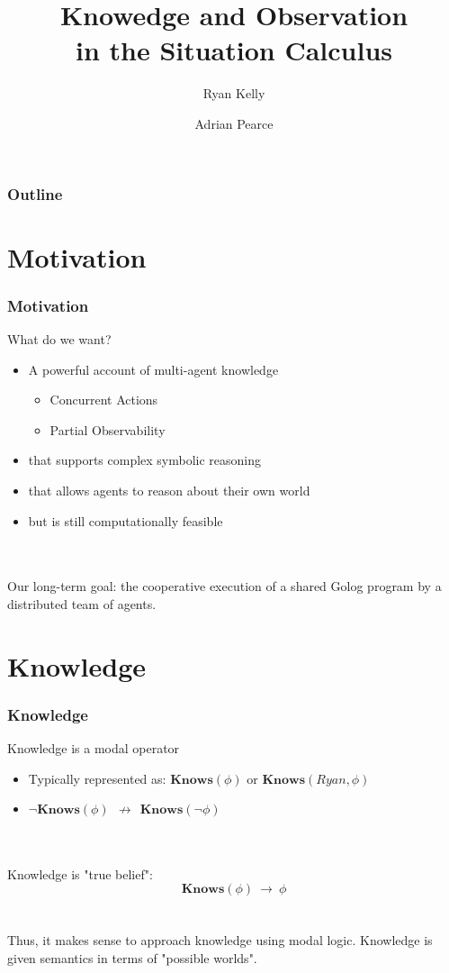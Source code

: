 \documentclass{beamer}
\title{Knowedge and Observation\\ in the Situation Calculus}
\author[Ryan Kelly (rfk@csse.unimelb.edu.au)]{Ryan Kelly \and Adrian Pearce}
\begin{document}
\begin{frame}
  \titlepage
\end{frame}

\begin{frame}
  \frametitle{Outline}
  \tableofcontents
\end{frame}

\section{Motivation}

\begin{frame}
\frametitle{Motivation}
What do we want?
\begin{itemize}
\item A powerful account of multi-agent knowledge
  \begin{itemize}
  \item Concurrent Actions
  \item Partial Observability
  \end{itemize}
\item that supports complex symbolic reasoning
\item that allows agents to reason about their own world
\item but is still computationally feasible
\end{itemize}
\ \\
\ \\
\pause
Our long-term goal: the cooperative execution of a shared Golog program
by a distributed team of agents.
\end{frame}


\section{Knowledge}

\begin{frame}
\frametitle{Knowledge}

Knowledge is a modal operator
\begin{itemize}
\item Typically represented as: $\mathbf{Knows}(\phi)$ or $\mathbf{Knows}(Ryan,\phi)$
\item $\neg\mathbf{Knows}(\phi)\ \ \not\rightarrow\ \ \mathbf{Knows}(\neg\phi)$
\end{itemize}
\ \\
\ \\
Knowledge is "true belief":
\[ \mathbf{Knows}(\phi)\ \rightarrow\ \phi \]
\ \\
\ \\
Thus, it makes sense to approach knowledge using modal logic.
Knowledge is given semantics in terms of "possible worlds".

\end{frame}
\end{document}
